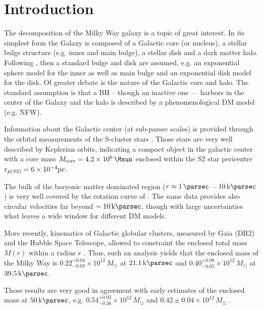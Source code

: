 \section{Introduction}
\label{sec:introduction}
The decomposition of the Milky Way galaxy is a topic of great interest. In its simplest form the Galaxy is composed of a Galactic core (or nucleus), a stellar bulge structure (e.g. inner and main bulge), a stellar disk and a dark matter halo. Following \citet{2013PASJ...65..118S}, then a standard bulge and disk are assumed, e.g. an exponential sphere model for the inner as well as main bulge and an exponential disk model for the disk. Of greater debate is the nature of the Galactic core and halo. The standard assumption is that a BH -- though an inactive one --- harbors in the center of the Galaxy and the halo is described by a phenomenological DM model (e.g. NFW).

Information about the Galactic center (at sub-parsec scales) is provided through the orbital measurements of the S-cluster stars \citep{2009ApJ...707L.114G}. Those stars are very well described by Keplerian orbits, indicating a compact object in the galactic center with a core mass $M_{\rm core} = \SI{4.2E6}{\Msun}$ enclosed within the S2 star pericentre $r_{p(S2)}=6\times 10^{-4} {\rm pc}$.

The bulk of the baryonic matter dominated region ($r \approx \SI{1}{\parsec}$ -- $\SI{10}{\kilo\parsec}$) is very well covered by the rotation curve of \citet{2013PASJ...65..118S}. The same data provides also circular velocities far beyond $\sim\SI{10}{\kilo\parsec}$, though with large uncertainties what leaves a wide window for different DM models.

More recently, kinematics of Galactic globular clusters, measured by Gaia (DR2) and the Hubble Space Telescope, allowed to constraint the enclosed total mass $M(r)$ within a radius $r$ \citep{2018arXiv180411348W}. Thus, such an analysis yields that the enclosed mass of the Milky Way is $0.22^{+0.04}_{-0.03} \times 10^{12}\,M_\odot$ at $\SI{21.1}{\kilo\parsec}$ and $0.40^{+0.08}_{-0.05} \times 10^{12}\,M_\odot$ at $\SI{39.5}{\kilo\parsec}$.

Those results are very good in agreement with early estimates of the enclosed mass at $\SI{50}{\kilo\parsec}$, e.g. $0.54^{+0.02}_{-0.36} \times 10^{12}\,M_\odot$ \citep{1999MNRAS.310..645W} and $0.42 \pm 0.04 \times 10^{12}\,M_\odot$ \citep{2012MNRAS.424L..44D}.

